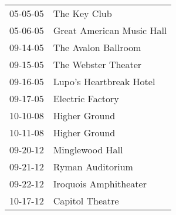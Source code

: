 \begin{supertabular}{p{0.07\textwidth}p{0.23\textwidth}}
 05-05-05 &               The Key Club \\
 05-06-05 &  Great American Music Hall \\
 09-14-05 &        The Avalon Ballroom \\
 09-15-05 &        The Webster Theater \\
 09-16-05 &    Lupo's Heartbreak Hotel \\
 09-17-05 &           Electric Factory \\
 10-10-08 &              Higher Ground \\
 10-11-08 &              Higher Ground \\
 09-20-12 &            Minglewood Hall \\
 09-21-12 &           Ryman Auditorium \\
 09-22-12 &      Iroquois Amphitheater \\
 10-17-12 &            Capitol Theatre \\
\end{supertabular}
